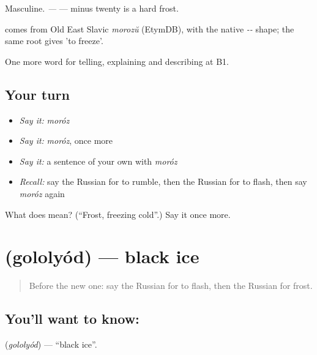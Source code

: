 Masculine. \emph{  —  } — minus twenty is a hard frost.

\begin{cousinweb}
\emph{} comes from Old East Slavic \emph{morozŭ} (EtymDB), with the native \emph{--} shape; the same root gives \emph{} 'to freeze'.
\end{cousinweb}

\begin{grammarlens}[title={What you've built}]
One more word for telling, explaining and describing at B1.
\end{grammarlens}

\subsection*{Your turn}
\begin{itemize}
\raggedright
  \item \emph{Say it:} \emph{moróz}
  \item \emph{Say it:} \emph{moróz}, once more
  \item \emph{Say it:} a sentence of your own with \emph{moróz}
  \item \emph{Recall:} say the Russian for to rumble, then the Russian for to flash, then say \emph{moróz} again
\end{itemize}

\begin{tcolorbox}[breakable,colback=teal!4,colframe=teal!35!black,title={Before you move on}]
What does  mean? (\textquotedblleft{}Frost, freezing cold\textquotedblright{}.) Say it once more.
\end{tcolorbox}
\section[\texorpdfstring{\ru{гололёд} (gololyód)}{гололёд (gololyód)}]{ (gololyód) — black ice}

\label{lesson:RU-C467-gololyod}



\begin{quote}
Before the new one: say the Russian for to flash, then the Russian for frost.
\end{quote}

\subsection*{You'll want to know: }
\textbf{} (\emph{gololyód}) — \textquotedblleft{}black ice\textquotedblright{}.

